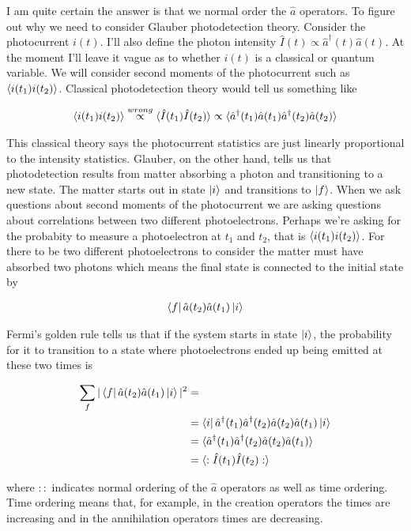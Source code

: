 \documentclass[12pt]{article}
\newcommand{\ahat}{\hat{a}}
\newcommand{\adag}{\ahat^{\dag}}
\begin{document}
I am quite certain the answer is that we normal order the $\ahat$ operators. To figure out why we need to consider Glauber photodetection theory. Consider the photocurrent $i(t)$. I'll also define the photon intensity $\hat{I}(t)\propto\adag(t)\ahat(t)$. At the moment I'll leave it vague as to whether $i(t)$ is a classical or quantum variable. We will consider second moments of the photocurrent such as $\braket{i(t_1)i(t_2)}$. Classical photodetection theory would tell us something like

\begin{align}
\braket{i(t_1)i(t_2)} \stackrel{wrong}{\propto} \braket{\hat{I}(t_1)\hat{I}(t_2)} \propto \braket{\adag(t_1)\ahat(t_1)\adag(t_2)\ahat(t_2)}
\end{align}

This classical theory says the photocurrent statistics are just linearly proportional to the intensity statistics. Glauber, on the other hand, tells us that photodetection results from matter absorbing a photon and transitioning to a new state. The matter starts out in state $\ket{i}$ and transitions to $\ket{f}$. When we ask questions about second moments of the photocurrent we are asking questions about correlations between two different photoelectrons. Perhaps we're asking for the probabity to measure a photoelectron at $t_1$ and $t_2$, that is $\braket{i(t_1)i(t_2)}$. For there to be two different photoelectrons to consider the matter must have absorbed two photons which means the final state is connected to the initial state by

\begin{align}
\bra{f}\ahat(t_2)\ahat(t_1)\ket{i}
\end{align}

Fermi's golden rule tells us that if the system starts in state $\ket{i}$, the probability for it to transition to a state where photoelectrons ended up being emitted at these two times is

\begin{align}
\sum_{f} |\bra{f}\ahat(t_2)\ahat(t_1)\ket{i}|^2 &= \\
&= \bra{i} \adag(t_1)\adag(t_2)\ahat(t_2)\ahat(t_1)\ket{i}\\
&= \braket{\adag(t_1)\adag(t_2)\ahat(t_2)\ahat(t_1)}\\
&= \braket{:\hat{I}(t_1)\hat{I}(t_2):}
\end{align}

where $::$ indicates normal ordering of the $\ahat$ operators as well as time ordering. Time ordering means that, for example, in the creation operators the times are increasing and in the annihilation operators times are decreasing.
\end{document}
